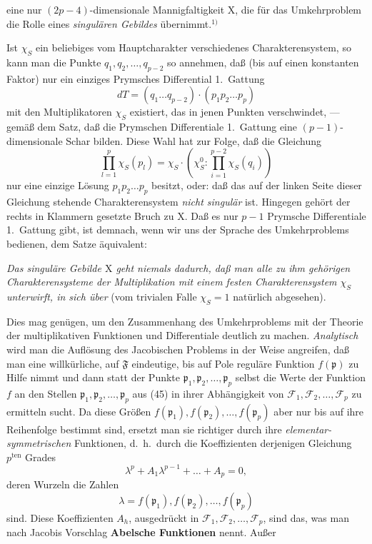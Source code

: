 \documentclass{article}
\begin{document}
eine nur $(2p - 4)$-dimensionale Mannigfaltigkeit $\mathrm{X}$, die für das Umkehrproblem die Rolle eines \emph{singulären Gebildes} übernimmt.${}^{1)}$

Ist $\chi_S$ ein beliebiges vom Hauptcharakter verschiedenes Charakterensystem, so kann man die Punkte $q_1, q_2, \dots, q_{p-2}$ so annehmen, daß (bis auf einen konstanten Faktor) nur ein einziges Prymsches Differential 1.\ Gattung
\[ dT = (q_1 \dots q_{p-2}) \cdot (p_1 p_2 \dots p_p) \]
mit den Multiplikatoren $\chi_S$ existiert, das in jenen Punkten verschwindet, --- gemäß dem Satz, daß die Prymschen Differentiale 1.\ Gattung eine $(p - 1)$-dimensionale Schar bilden. Diese Wahl hat zur Folge, daß die Gleichung
\[ \prod_{l=1}^p \chi_S(p_l) = \chi_S \cdot \left( \chi_S^0 : \prod_{i=1}^{p-2} \chi_S(q_i) \right) \]
nur eine einzige Lösung $p_1 p_2 \dots p_p$ besitzt, oder: daß das auf der linken Seite dieser Gleichung stehende Charakterensystem \emph{nicht singulär} ist. Hingegen gehört der rechts in Klammern gesetzte Bruch zu $\mathrm{X}$. Daß es nur $p - 1$ Prymsche Differentiale 1.\ Gattung gibt, ist demnach, wenn wir uns der Sprache des Umkehrproblems bedienen, dem Satze äquivalent:

\emph{Das singuläre Gebilde $\mathrm{X}$ geht niemals dadurch, daß man alle zu ihm gehörigen Charakterensysteme der Multiplikation mit einem festen Charakterensystem $\chi_S$ unterwirft, in sich über} (vom trivialen Falle $\chi_S = 1$ natürlich abgesehen).

Dies mag genügen, um den Zusammenhang des Umkehrproblems mit der Theorie der multiplikativen Funktionen und Differentiale deutlich zu machen. \emph{Analytisch} wird man die Auflösung des Jacobischen Problems in der Weise angreifen, daß man eine willkürliche, auf $\mathfrak{F}$ eindeutige, bis auf Pole reguläre Funktion $f(\mathfrak{p})$ zu Hilfe nimmt und dann statt der Punkte $\mathfrak{p}_1, \mathfrak{p}_2, \dots, \mathfrak{p}_p$ selbst die Werte der Funktion $f$ an den Stellen $\mathfrak{p}_1, \mathfrak{p}_2, \dots, \mathfrak{p}_p$ aus (45) in ihrer Abhängigkeit von $\mathcal{F}_1, \mathcal{F}_2, \dots, \mathcal{F}_p$ zu ermitteln sucht. Da diese Größen $f(\mathfrak{p}_1), f(\mathfrak{p}_2), \dots, f(\mathfrak{p}_p)$ aber nur bis auf ihre Reihenfolge bestimmt sind, ersetzt man sie richtiger durch ihre \emph{elementar-symmetrischen} Funktionen, d.~h.\ durch die Koeffizienten derjenigen Gleichung $p^{\text{ten}}$ Grades
\[ \lambda^p + A_1 \lambda^{p-1} + \dots + A_p = 0, \]
deren Wurzeln die Zahlen
\[ \lambda = f(\mathfrak{p}_1), f(\mathfrak{p}_2), \dots, f(\mathfrak{p}_p) \]
sind. Diese Koeffizienten $A_h$, ausgedrückt in $\mathcal{F}_1, \mathcal{F}_2, \dots, \mathcal{F}_p$, sind das, was man nach Jacobis Vorschlag \textbf{Abelsche Funktionen} nennt. Außer
\end{document}
